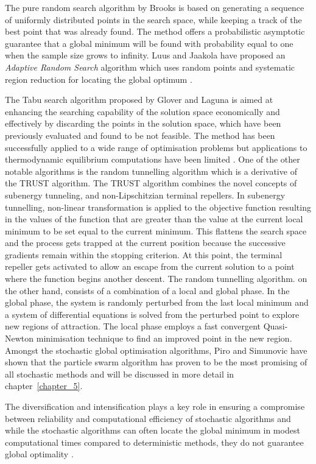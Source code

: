 	The pure random search algorithm by Brooks \cite{Brooks:1958aa} is based on generating a sequence of uniformly distributed points in the search space, while keeping a track of the best point that was already found. The method offers a probabilistic asymptotic guarantee that a global minimum will be found with probability equal to one when the sample size grows to infinity. Luus and Jaakola have proposed an \emph{Adaptive Random Search} algorithm which uses random points and systematic region reduction for locating the global optimum \cite{Luus:1973aa}. 
	
	The Tabu search algorithm proposed by Glover and Laguna \cite{Glover:1993aa} is aimed at enhancing the searching capability of the solution space economically and effectively by discarding the points in the solution space, which have been previously evaluated and found to be not feasible. The method has been successfully applied to a wide range of optimisation problems but  applications to thermodynamic equilibrium computations have been limited \cite{SRINIVAS2007760,Teh03}. One of the other notable algorithms is the random tunnelling algorithm which is a derivative of the TRUST algorithm. The TRUST algorithm \cite{Barhen97} combines the novel concepts of subenergy tunneling, and non-Lipschitzian terminal repellers. In subenergy tunnelling, non-linear transformation is applied to the objective function resulting in the values of the function that are greater than the value at the current local minimum to be set equal to the current minimum. This flattens the search space and the process gets trapped at the current position because the successive gradients remain within the stopping criterion. At this point, the terminal repeller gets activated to allow an escape from the current solution to a point where the function begins another descent. The random tunnelling algorithm. on the other hand, consists of a combination of a local and global phase. In the global phase, the system is randomly perturbed from the last local minimum and a system of differential equations is solved from the perturbed point to explore new regions of attraction. The local phase employs a fast convergent Quasi-Newton minimisation technique to find an improved point in the new region. Amongst the stochastic global optimisation algorithms, Piro and Simunovic \cite{Piro16} have shown that the particle swarm algorithm has proven to be the most promising of all stochastic methods and will be discussed in more detail in chapter~\ref{chapter_5}.
	
	The diversification and intensification plays a key role in ensuring a compromise between reliability and computational efficiency of stochastic algorithms and while the stochastic algorithms can often locate the global minimum in modest computational times compared to deterministic methods, they do not guarantee global optimality \cite{Zhang11,Blum:2003aa}.
		
